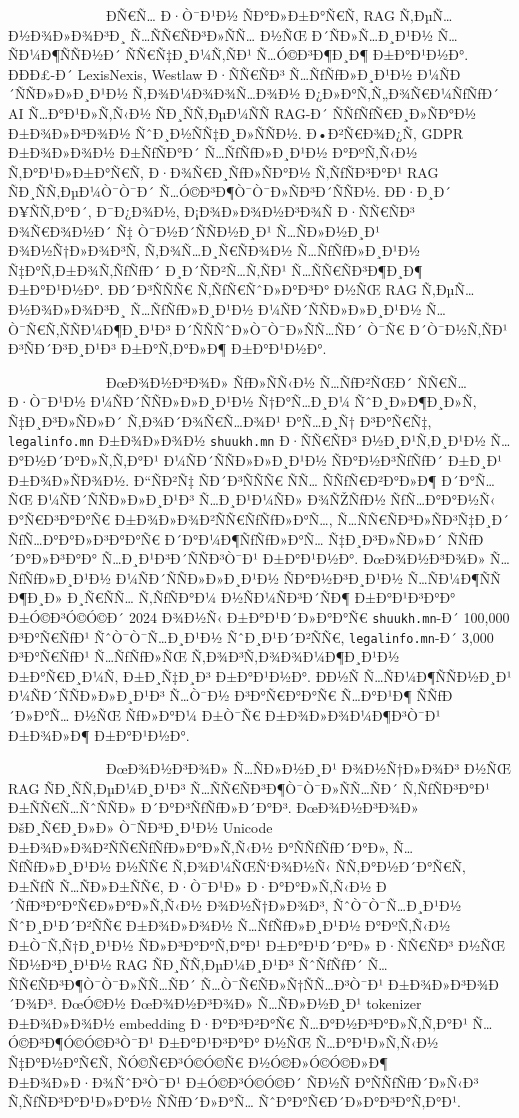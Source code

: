 \documentclass[12pt,A4]{report}
\begin{document}
\
\ \ \ \ \ \ \ \ \  \ \ \ \ Ð­Ñ€Ñ… Ð·Ò¯Ð¹Ð½ ÑÐ°Ð»Ð±Ð°Ñ€Ñ‚ RAG Ñ‚ÐµÑ…Ð½Ð¾Ð»Ð¾Ð³Ð¸ Ñ…ÑÑ€ÑÐ³Ð»ÑÑ… Ð½ÑŒ
Ð´ÑÐ»Ñ…Ð¸Ð¹Ð½ Ñ…ÑÐ¼Ð¶ÑÑÐ½Ð´ ÑÑ€Ñ‡Ð¸Ð¼Ñ‚ÑÐ¹ Ñ…Ó©Ð³Ð¶Ð¸Ð¶ Ð±Ð°Ð¹Ð½Ð°. ÐÐÐ£-Ð´ LexisNexis, Westlaw Ð·ÑÑ€ÑÐ³
Ñ…ÑƒÑƒÐ»Ð¸Ð¹Ð½ Ð¼ÑÐ´ÑÑÐ»Ð»Ð¸Ð¹Ð½ Ñ‚Ð¾Ð¼Ð¾Ð¾Ñ…Ð¾Ð½ Ð¿Ð»Ð°Ñ‚Ñ„Ð¾Ñ€Ð¼ÑƒÑƒÐ´ AI Ñ…Ð°Ð¹Ð»Ñ‚Ñ‹Ð½ ÑÐ¸ÑÑ‚ÐµÐ¼ÑÑ RAG-Ð´
ÑÑƒÑƒÑ€Ð¸Ð»ÑÐ°Ð½ Ð±Ð¾Ð»Ð³Ð¾Ð½ ÑˆÐ¸Ð½ÑÑ‡Ð¸Ð»ÑÑÐ½. Ð•Ð²Ñ€Ð¾Ð¿Ñ‚ GDPR Ð±Ð¾Ð»Ð¾Ð½ Ð±ÑƒÑÐ°Ð´ Ñ…ÑƒÑƒÐ»Ð¸Ð¹Ð½ Ð°ÐºÑ‚Ñ‹Ð½
Ñ‚Ð°Ð¹Ð»Ð±Ð°Ñ€Ñ‚ Ð·Ð¾Ñ€Ð¸ÑƒÐ»ÑÐ°Ð½ Ñ‚ÑƒÑÐ³Ð°Ð¹ RAG ÑÐ¸ÑÑ‚ÐµÐ¼Ò¯Ò¯Ð´ Ñ…Ó©Ð³Ð¶Ò¯Ò¯Ð»ÑÐ³Ð´ÑÑÐ½. ÐÐ·Ð¸Ð´ Ð¥ÑÑ‚Ð°Ð´,
Ð¯Ð¿Ð¾Ð½, Ð¡Ð¾Ð»Ð¾Ð½Ð³Ð¾Ñ Ð·ÑÑ€ÑÐ³ Ð¾Ñ€Ð¾Ð½Ð´ Ñ‡ Ò¯Ð½Ð´ÑÑÐ½Ð¸Ð¹ Ñ…ÑÐ»Ð½Ð¸Ð¹ Ð¾Ð½Ñ†Ð»Ð¾Ð³Ñ‚ Ñ‚Ð¾Ñ…Ð¸Ñ€ÑÐ¾Ð½ Ñ…ÑƒÑƒÐ»Ð¸Ð¹Ð½
Ñ‡Ð°Ñ‚Ð±Ð¾Ñ‚ÑƒÑƒÐ´ Ð¸Ð´ÑÐ²Ñ…Ñ‚ÑÐ¹ Ñ…ÑÑ€ÑÐ³Ð¶Ð¸Ð¶ Ð±Ð°Ð¹Ð½Ð°. Ð­Ð´Ð³ÑÑÑ€ Ñ‚ÑƒÑ€ÑˆÐ»Ð°Ð³Ð° Ð½ÑŒ RAG Ñ‚ÐµÑ…Ð½Ð¾Ð»Ð¾Ð³Ð¸
Ñ…ÑƒÑƒÐ»Ð¸Ð¹Ð½ Ð¼ÑÐ´ÑÑÐ»Ð»Ð¸Ð¹Ð½ Ñ…Ò¯Ñ€Ñ‚ÑÑÐ¼Ð¶Ð¸Ð¹Ð³ Ð´ÑÑÑˆÐ»Ò¯Ò¯Ð»ÑÑ…ÑÐ´ Ò¯Ñ€ Ð´Ò¯Ð½Ñ‚ÑÐ¹ Ð³ÑÐ´Ð³Ð¸Ð¹Ð³
Ð±Ð°Ñ‚Ð°Ð»Ð¶ Ð±Ð°Ð¹Ð½Ð°.

\
\ \ \ \ \ \ \ \ \  \ \ \ \ ÐœÐ¾Ð½Ð³Ð¾Ð» ÑƒÐ»ÑÑ‹Ð½ Ñ…ÑƒÐ²ÑŒÐ´ ÑÑ€Ñ… Ð·Ò¯Ð¹Ð½ Ð¼ÑÐ´ÑÑÐ»Ð»Ð¸Ð¹Ð½
Ñ†Ð°Ñ…Ð¸Ð¼ ÑˆÐ¸Ð»Ð¶Ð¸Ð»Ñ‚ Ñ‡Ð¸Ð³Ð»ÑÐ»Ð´ Ñ‚Ð¾Ð´Ð¾Ñ€Ñ…Ð¾Ð¹ Ð°Ñ…Ð¸Ñ† Ð³Ð°Ñ€Ñ‡, \texttt{legalinfo.mn} Ð±Ð¾Ð»Ð¾Ð½
\texttt{shuukh.mn} Ð·ÑÑ€ÑÐ³ Ð½Ð¸Ð¹Ñ‚Ð¸Ð¹Ð½ Ñ…Ð°Ð½Ð´Ð°Ð»Ñ‚Ñ‚Ð°Ð¹ Ð¼ÑÐ´ÑÑÐ»Ð»Ð¸Ð¹Ð½ ÑÐ°Ð½Ð³ÑƒÑƒÐ´ Ð±Ð¸Ð¹
Ð±Ð¾Ð»ÑÐ¾Ð½. Ð“ÑÐ²Ñ‡ ÑÐ´Ð³ÑÑÑ€ ÑÑ… ÑÑƒÑ€Ð²Ð°Ð»Ð¶ Ð´Ð°Ñ…ÑŒ Ð¼ÑÐ´ÑÑÐ»Ð»Ð¸Ð¹Ð³ Ñ…Ð¸Ð¹Ð¼ÑÐ» Ð¾ÑŽÑƒÐ½ ÑƒÑ…Ð°Ð°Ð½Ñ‹
Ð°Ñ€Ð³Ð°Ð°Ñ€ Ð±Ð¾Ð»Ð¾Ð²ÑÑ€ÑƒÑƒÐ»Ð°Ñ…, Ñ…ÑÑ€ÑÐ³Ð»ÑÐ³Ñ‡Ð¸Ð´ ÑƒÑ…Ð°Ð°Ð»Ð³Ð°Ð°Ñ€ Ð´Ð°Ð¼Ð¶ÑƒÑƒÐ»Ð°Ñ… Ñ‡Ð¸Ð³Ð»ÑÐ»Ð´ ÑÑƒÐ´Ð°Ð»Ð³Ð°Ð°
Ñ…Ð¸Ð¹Ð³Ð´ÑÑÐ³Ò¯Ð¹ Ð±Ð°Ð¹Ð½Ð°. ÐœÐ¾Ð½Ð³Ð¾Ð» Ñ…ÑƒÑƒÐ»Ð¸Ð¹Ð½ Ð¼ÑÐ´ÑÑÐ»Ð»Ð¸Ð¹Ð½ ÑÐ°Ð½Ð³Ð¸Ð¹Ð½ Ñ…ÑÐ¼Ð¶ÑÑ Ð¶Ð¸Ð» Ð¸Ñ€ÑÑ…
Ñ‚ÑƒÑÐ°Ð¼ Ð½ÑÐ¼ÑÐ³Ð´ÑÐ¶ Ð±Ð°Ð¹Ð³Ð°Ð° Ð±Ó©Ð³Ó©Ó©Ð´ 2024 Ð¾Ð½Ñ‹ Ð±Ð°Ð¹Ð´Ð»Ð°Ð°Ñ€ \texttt{shuukh.mn}-Ð´
100,000 Ð³Ð°Ñ€ÑƒÐ¹ ÑˆÒ¯Ò¯Ñ…Ð¸Ð¹Ð½ ÑˆÐ¸Ð¹Ð´Ð²ÑÑ€, \texttt{legalinfo.mn}-Ð´ 3,000 Ð³Ð°Ñ€ÑƒÐ¹
Ñ…ÑƒÑƒÐ»ÑŒ Ñ‚Ð¾Ð³Ñ‚Ð¾Ð¾Ð¼Ð¶Ð¸Ð¹Ð½ Ð±Ð°Ñ€Ð¸Ð¼Ñ‚ Ð±Ð¸Ñ‡Ð¸Ð³ Ð±Ð°Ð¹Ð½Ð°. Ð­Ð½Ñ Ñ…ÑÐ¼Ð¶ÑÑÐ½Ð¸Ð¹ Ð¼ÑÐ´ÑÑÐ»Ð»Ð¸Ð¹Ð³ Ñ…Ò¯Ð½
Ð³Ð°Ñ€Ð°Ð°Ñ€ Ñ…Ð°Ð¹Ð¶ ÑÑƒÐ´Ð»Ð°Ñ… Ð½ÑŒ ÑƒÐ»Ð°Ð¼ Ð±Ò¯Ñ€ Ð±Ð¾Ð»Ð¾Ð¼Ð¶Ð³Ò¯Ð¹ Ð±Ð¾Ð»Ð¶ Ð±Ð°Ð¹Ð½Ð°.

\
\ \ \ \ \ \ \ \ \  \ \ \ \ ÐœÐ¾Ð½Ð³Ð¾Ð» Ñ…ÑÐ»Ð½Ð¸Ð¹ Ð¾Ð½Ñ†Ð»Ð¾Ð³ Ð½ÑŒ RAG ÑÐ¸ÑÑ‚ÐµÐ¼Ð¸Ð¹Ð³
Ñ…ÑÑ€ÑÐ³Ð¶Ò¯Ò¯Ð»ÑÑ…ÑÐ´ Ñ‚ÑƒÑÐ³Ð°Ð¹ Ð±ÑÑ€Ñ…ÑˆÑÑÐ» Ð´Ð°Ð³ÑƒÑƒÐ»Ð´Ð°Ð³. ÐœÐ¾Ð½Ð³Ð¾Ð» ÐšÐ¸Ñ€Ð¸Ð»Ð» Ò¯ÑÐ³Ð¸Ð¹Ð½
Unicode Ð±Ð¾Ð»Ð¾Ð²ÑÑ€ÑƒÑƒÐ»Ð°Ð»Ñ‚Ñ‹Ð½ Ð°ÑÑƒÑƒÐ´Ð°Ð», Ñ…ÑƒÑƒÐ»Ð¸Ð¹Ð½ Ð½ÑÑ€ Ñ‚Ð¾Ð¼ÑŒÑ‘Ð¾Ð½Ñ‹ ÑÑ‚Ð°Ð½Ð´Ð°Ñ€Ñ‚ Ð±ÑƒÑ
Ñ…ÑÐ»Ð±ÑÑ€, Ð·Ò¯Ð¹Ð» Ð·Ð°Ð°Ð»Ñ‚Ñ‹Ð½ Ð´ÑƒÐ³Ð°Ð°Ñ€Ð»Ð°Ð»Ñ‚Ñ‹Ð½ Ð¾Ð½Ñ†Ð»Ð¾Ð³, ÑˆÒ¯Ò¯Ñ…Ð¸Ð¹Ð½ ÑˆÐ¸Ð¹Ð´Ð²ÑÑ€ Ð±Ð¾Ð»Ð¾Ð½
Ñ…ÑƒÑƒÐ»Ð¸Ð¹Ð½ Ð°ÐºÑ‚Ñ‹Ð½ Ð±Ò¯Ñ‚Ñ†Ð¸Ð¹Ð½ ÑÐ»Ð³Ð°Ð°Ñ‚Ð°Ð¹ Ð±Ð°Ð¹Ð´Ð°Ð» Ð·ÑÑ€ÑÐ³ Ð½ÑŒ ÑÐ½Ð³Ð¸Ð¹Ð½ RAG ÑÐ¸ÑÑ‚ÐµÐ¼Ð¸Ð¹Ð³
ÑˆÑƒÑƒÐ´ Ñ…ÑÑ€ÑÐ³Ð¶Ò¯Ò¯Ð»ÑÑ…ÑÐ´ Ñ…Ò¯Ñ€ÑÐ»Ñ†ÑÑ…Ð³Ò¯Ð¹ Ð±Ð¾Ð»Ð³Ð¾Ð´Ð¾Ð³. ÐœÓ©Ð½ ÐœÐ¾Ð½Ð³Ð¾Ð» Ñ…ÑÐ»Ð½Ð¸Ð¹
tokenizer Ð±Ð¾Ð»Ð¾Ð½ embedding Ð·Ð°Ð³Ð²Ð°Ñ€ Ñ…Ð°Ð½Ð³Ð°Ð»Ñ‚Ñ‚Ð°Ð¹ Ñ…Ó©Ð³Ð¶Ó©Ó©Ð³Ò¯Ð¹ Ð±Ð°Ð¹Ð³Ð°Ð° Ð½ÑŒ
Ñ…Ð°Ð¹Ð»Ñ‚Ñ‹Ð½ Ñ‡Ð°Ð½Ð°Ñ€Ñ‚ ÑÓ©Ñ€Ð³Ó©Ó©Ñ€ Ð½Ó©Ð»Ó©Ó©Ð»Ð¶ Ð±Ð¾Ð»Ð·Ð¾ÑˆÐ³Ò¯Ð¹ Ð±Ó©Ð³Ó©Ó©Ð´ ÑÐ½Ñ Ð°ÑÑƒÑƒÐ´Ð»Ñ‹Ð³
Ñ‚ÑƒÑÐ³Ð°Ð¹Ð»Ð°Ð½ ÑÑƒÐ´Ð»Ð°Ñ… ÑˆÐ°Ð°Ñ€Ð´Ð»Ð°Ð³Ð°Ñ‚Ð°Ð¹.
\end{document}
